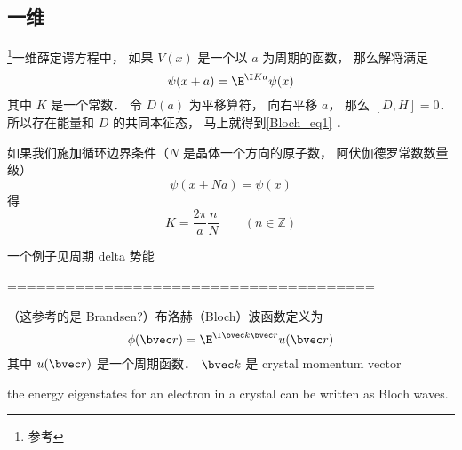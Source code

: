 
\begin{issues}
\issueDraft
\end{issues}


\subsection{一维}
\footnote{参考\cite{GriffQ}}一维薛定谔方程中， 如果 $V(x)$ 是一个以 $a$ 为周期的函数， 那么解将满足
\begin{equation}\label{Bloch_eq1}
\psi(x+a) = \E^{\I K a}\psi(x)
\end{equation}
其中 $K$ 是一个常数． 令 $D(a)$ 为平移算符， 向右平移 $a$， 那么 $[D,H] = 0$． 所以存在能量和 $D$ 的共同本征态， 马上就得到\autoref{Bloch_eq1} ．

如果我们施加循环边界条件（$N$ 是晶体一个方向的原子数， 阿伏伽德罗常数数量级）
\begin{equation}
\psi(x+Na) = \psi(x)
\end{equation}
得
\begin{equation}
K = \frac{2\pi}{a} \frac{n}{N} \qquad (n \in \mathbb Z)
\end{equation}

一个例子见周期 delta 势能

======================================

（这参考的是 Brandsen?）布洛赫（Bloch）波函数定义为
\begin{equation}
\phi(\bvec r) = \E^{\I \bvec k \bvec r} u(\bvec r)
\end{equation}
其中 $u(\bvec r)$ 是一个周期函数． $\bvec k$ 是 crystal momentum vector

the energy eigenstates for an electron in a crystal can be written as Bloch waves.
